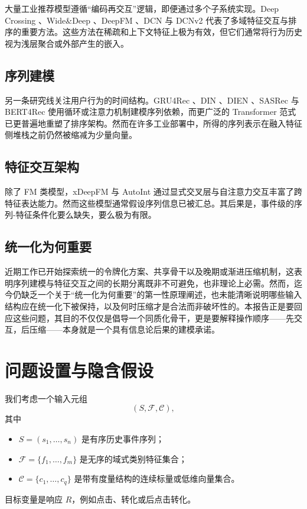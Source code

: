 \documentclass{article}
\begin{document}
大量工业推荐模型遵循“编码再交互”逻辑，即便通过多个子系统实现。Deep Crossing \cite{shan2016deep}、Wide\&Deep \cite{cheng2016wide}、DeepFM \cite{guo2017deepfm}、DCN \cite{wang2017deep} 与 DCNv2 \cite{wang2021dcnv2} 代表了多域特征交互与排序的重要方法。这些方法在稀疏和上下文特征上极为有效，但它们通常将行为历史视为浅层聚合或外部产生的嵌入。

\subsection{序列建模}

另一条研究线关注用户行为的时间结构。GRU4Rec \cite{hidasi2016session}、DIN \cite{zhou2018deep}、DIEN \cite{zhou2019deep}、SASRec \cite{kang2018self} 与 BERT4Rec \cite{sun2019bert4rec} 使用循环或注意力机制建模序列依赖，而更广泛的 Transformer 范式 \cite{vaswani2017attention} 已更普遍地重塑了排序架构。然而在许多工业部署中，所得的序列表示在融入特征侧堆栈之前仍然被缩减为少量向量。

\subsection{特征交互架构}

除了 FM 类模型，xDeepFM \cite{lian2018xdeepfm} 与 AutoInt \cite{song2019autoint} 通过显式交叉层与自注意力交互丰富了跨特征表达能力。然而这些模型通常假设序列信息已被汇总。其后果是，事件级的序列-特征条件化要么缺失，要么极为有限。

\subsection{统一化为何重要}

近期工作已开始探索统一的令牌化方案、共享骨干以及晚期或渐进压缩机制，这表明序列建模与特征交互之间的长期分离既非不可避免，也非理论上必需。然而，迄今仍缺乏一个关于“统一化为何重要”的第一性原理阐述，也未能清晰说明哪些输入结构应在统一化下被保持，以及何时压缩才是合法而非破坏性的。本报告正是要回应这些问题，其目的不仅仅是倡导一个同质化骨干，更是要解释操作顺序——先交互，后压缩——本身就是一个具有信息论后果的建模承诺。

\section{问题设置与隐含假设}

我们考虑一个输入元组
\[
(S,\mathcal{F},\mathcal{C}),
\]
其中
\begin{itemize}
\item \(S = (s_1,\ldots,s_n)\) 是有序历史事件序列；
\item \(\mathcal{F} = \{f_1,\ldots,f_m\}\) 是无序的域式类别特征集合；
\item \(\mathcal{C} = \{c_1,\ldots,c_q\}\) 是带有度量结构的连续标量或低维向量集合。
\end{itemize}
目标变量是响应 \(R\)，例如点击、转化或后点击转化。
\end{document}
